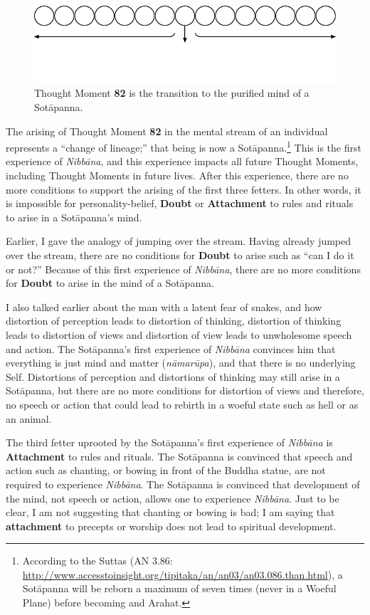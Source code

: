 \begin{figure}[h]
\centering
\includegraphics[width=1.0\linewidth]{./Diagrams/Magga}
\caption{Thought Moment \textbf{82} is the transition to the purified mind of a Sotāpanna.}
\label{fig:Magga}
\end{figure}

The arising of Thought Moment \textbf{82} in the mental stream of an individual represents a “change of lineage;” that being is now a Sotāpanna.\footnote{According to the Suttas (AN 3.86: \url{http://www.accesstoinsight.org/tipitaka/an/an03/an03.086.than.html}), a Sotāpanna will be reborn a maximum of seven times (never in a Woeful Plane) before becoming and Arahat.} This is the first experience of \textit{Nibbāna}, and this experience impacts all future Thought Moments, including Thought Moments in future lives. After this experience, there are no more conditions to support the arising of the first three fetters. In other words, it is impossible for personality-belief, \textbf{Doubt} or \textbf{Attachment} to rules and rituals to arise in a Sotāpanna’s mind.

Earlier, I gave the analogy of jumping over the stream. Having already jumped over the stream, there are no conditions for \textbf{Doubt} to arise such as “can I do it or not?” Because of this first experience of \textit{Nibbāna}, there are no more conditions for \textbf{Doubt} to arise in the mind of a Sotāpanna.

I also talked earlier about the man with a latent fear of snakes, and how distortion of perception leads to distortion of thinking, distortion of thinking leads to distortion of views and distortion of view leads to unwholesome speech and action. The Sotāpanna’s first experience of \textit{Nibbāna} convinces him that everything is just mind and matter (\textit{nāmarūpa}), and that there is no underlying Self. Distortions of perception and distortions of thinking may still arise in a Sotāpanna, but there are no more conditions for distortion of views and therefore, no speech or action that could lead to rebirth in a woeful state such as hell or as an animal.

The third fetter uprooted by the Sotāpanna’s first experience of \textit{Nibbāna} is \textbf{Attachment} to rules and rituals. The Sotāpanna is convinced that speech and action such as chanting, or bowing in front of the Buddha statue, are not required to experience \textit{Nibbāna}. The Sotāpanna is convinced that development of the mind, not speech or action, allows one to experience \textit{Nibbāna}. Just to be clear, I am not suggesting that chanting or bowing is bad; I am saying that \textbf{attachment} to precepts or worship does not lead to spiritual development.

